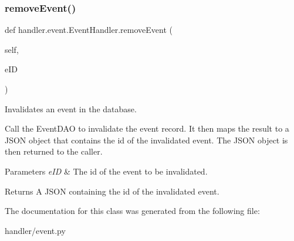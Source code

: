 \subsubsection{\texorpdfstring{remove\+Event()}{removeEvent()}}
{\footnotesize\ttfamily def handler.\+event.\+Event\+Handler.\+remove\+Event (\begin{DoxyParamCaption}\item[{}]{self,  }\item[{}]{e\+ID }\end{DoxyParamCaption})}



Invalidates an event in the database. 

Call the Event\+D\+AO to invalidate the event record. It then maps the result to a J\+S\+ON object that contains the id of the invalidated event. The J\+S\+ON object is then returned to the caller.


\begin{DoxyParams}{Parameters}
{\em e\+ID} & The id of the event to be invalidated.\\
\hline
\end{DoxyParams}
\begin{DoxyReturn}{Returns}
A J\+S\+ON containing the id of the invalidated event. 
\end{DoxyReturn}


The documentation for this class was generated from the following file\+:\begin{DoxyCompactItemize}
\item 
handler/event.\+py\end{DoxyCompactItemize}
